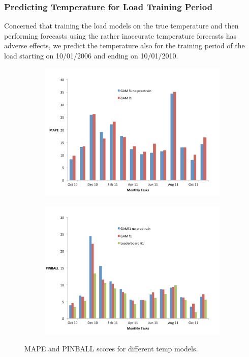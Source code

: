 \documentclass[conference]{IEEEtran}
\begin{document}
\subsubsection{Predicting Temperature for Load Training Period}
Concerned that training the load models on the true temperature and then performing forecasts using the rather inaccurate temperature forecasts has adverse effects, we predict the temperature also for the training period of the load starting on 10/01/2006 and ending on 10/01/2010.
\begin{figure}[!ht]
\centering
\begin{subfigure}[b]{\linewidth}
\includegraphics[width=\linewidth]{gfx/results/load/GAM-MAPE-predtrain.pdf}
\label{subfig:acf-temp-1year}
\end{subfigure}
\begin{subfigure}[b]{\linewidth}
\includegraphics[width=\linewidth]{gfx/results/load/GAM-PINBALL-predtrain.pdf}
\label{subfig:acf-load-1year}
\end{subfigure}
\caption{MAPE and PINBALL scores for different temp models.}
\label{fig:load-predtrain}
\end{figure}
\end{document}
